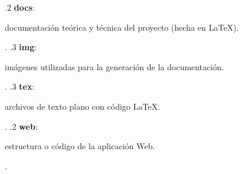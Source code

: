 \begin{figure}[H]
{        .2 \textbf{docs}: \begin{minipage}[t]{8cm}
            documentación teórica y técnica del proyecto (hecha en \LaTeX){.}\\
        \end{minipage}.
        .3 \textbf{img}: \begin{minipage}[t]{8cm}
            imágenes utilizadas para la generación de la documentación{.}\\
        \end{minipage}.
        .3 \textbf{tex}: \begin{minipage}[t]{8cm}
            archivos de texto plano con código \LaTeX{.}\\
        \end{minipage}.
        .2 \textbf{web}: \begin{minipage}[t]{8cm}
            estructura o código de la aplicación Web{.}\\
        \end{minipage}.
    }
\end{figure}

